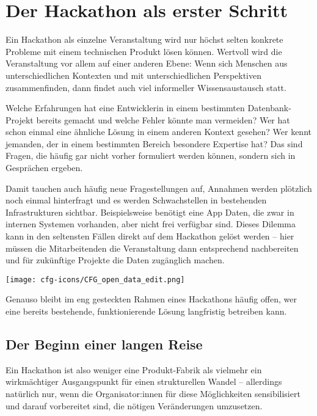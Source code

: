 \chapter{Der Hackathon als erster Schritt}

Ein Hackathon als einzelne Veranstaltung wird nur höchst selten konkrete Probleme mit einem technischen Produkt lösen können. Wertvoll wird die Veranstaltung vor allem auf einer anderen Ebene: Wenn sich Menschen aus unterschiedlichen Kontexten und mit unterschiedlichen Perspektiven zusammenfinden, dann findet auch viel informeller Wissensaustausch statt.

\begin{kaobox}
	Welche Erfahrungen hat eine Entwicklerin in einem bestimmten Datenbank-Projekt bereits gemacht und welche Fehler könnte man vermeiden? Wer hat schon einmal eine ähnliche Lösung in einem anderen Kontext gesehen? Wer kennt jemanden, der in einem bestimmten Bereich besondere Expertise hat? Das sind Fragen, die häufig gar nicht vorher formuliert werden können, sondern sich in Gesprächen ergeben.
\end{kaobox}

Damit tauchen auch häufig neue Fragestellungen auf, Annahmen werden plötzlich noch einmal hinterfragt und es werden Schwachstellen in bestehenden Infrastrukturen sichtbar. Beispielsweise benötigt eine App Daten, die zwar in internen Systemen vorhanden, aber nicht frei verfügbar sind. Dieses Dilemma kann in den seltensten Fällen direkt auf dem Hackathon gelöst werden – hier müssen die Mitarbeitenden die Veranstaltung dann entsprechend nachbereiten und für zukünftige Projekte die Daten zugänglich machen.

\begin{marginfigure}[-5.5cm]
	\texttt{[image: cfg-icons/CFG\_open\_data\_edit.png]}
\end{marginfigure}


Genauso bleibt im eng gesteckten Rahmen eines Hackathons häufig offen, wer eine bereits bestehende, funktionierende Lösung langfristig betreiben kann.

\section*{Der Beginn einer langen Reise}

Ein Hackathon ist also weniger eine Produkt-Fabrik als vielmehr ein wirkmächtiger Ausgangspunkt für einen strukturellen Wandel – allerdings natürlich nur, wenn die Organisator:innen für diese Möglichkeiten sensibilisiert und darauf vorbereitet sind, die nötigen Veränderungen umzusetzen.

